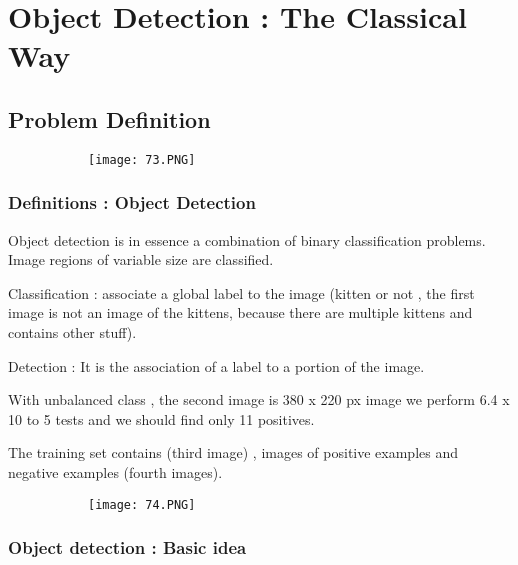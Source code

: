\documentclass{article}
\begin{document}
\vspace{50mm}

\section{Object Detection : The Classical Way}

\subsection{Problem Definition}

\begin{figure}[ht!]
  \centering
  \begin{subfigure}[b]{0.8\linewidth}
    \texttt{[image: 73.PNG]}
  \end{subfigure}
\end{figure}

\subsubsection{Definitions : Object Detection}

Object detection is in essence a combination of binary classification problems. Image regions of variable size are classified. 

Classification : associate a global label to the image (kitten or not , the first image is not an image of the kittens, because there are multiple kittens and contains other stuff).

Detection : It is the association of a label to a portion of the image.

With unbalanced class , the second image is 380 x 220 px image we perform 6.4 x 10 to 5 tests and we should find only 11 positives.

The training set contains  (third image) , images of positive examples and negative examples (fourth images).

\begin{figure}[ht!]
  \centering
  \begin{subfigure}[b]{0.2\linewidth}
    \texttt{[image: 74.PNG]}
  \end{subfigure}
\end{figure}

\subsubsection{Object detection : Basic idea}
\end{document}

